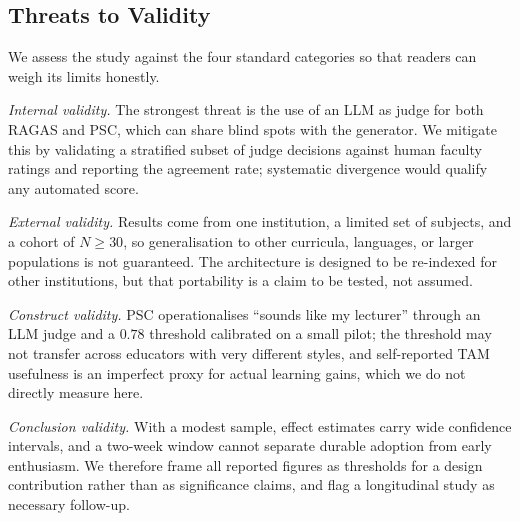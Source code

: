 \documentclass[conference]{IEEEtran}
\begin{document}
\subsection{Threats to Validity}
We assess the study against the four standard categories so that
readers can weigh its limits honestly.

\textit{Internal validity.} The strongest threat is the use of an LLM
as judge for both RAGAS and PSC, which can share blind spots with the
generator. We mitigate this by validating a stratified subset of judge
decisions against human faculty ratings and reporting the agreement
rate; systematic divergence would qualify any automated score.

\textit{External validity.} Results come from one institution, a
limited set of subjects, and a cohort of $N \geq 30$, so
generalisation to other curricula, languages, or larger populations is
not guaranteed. The architecture is designed to be re-indexed for other
institutions, but that portability is a claim to be tested, not assumed.

\textit{Construct validity.} PSC operationalises ``sounds like my
lecturer'' through an LLM judge and a $0.78$ threshold calibrated on a
small pilot; the threshold may not transfer across educators with very
different styles, and self-reported TAM usefulness is an imperfect proxy
for actual learning gains, which we do not directly measure here.

\textit{Conclusion validity.} With a modest sample, effect estimates
carry wide confidence intervals, and a two-week window cannot separate
durable adoption from early enthusiasm. We therefore frame all reported
figures as thresholds for a design contribution rather than as
significance claims, and flag a longitudinal study as necessary
follow-up.
\end{document}
